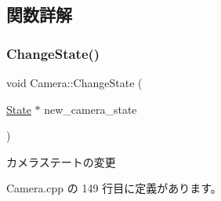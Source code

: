\subsection{関数詳解}
\mbox{\label{class_camera_abb88028a49a71e9a6774d58076816dbf}} 
\subsubsection{\texorpdfstring{Change\+State()}{ChangeState()}}
{\footnotesize\ttfamily void Camera\+::\+Change\+State (\begin{DoxyParamCaption}\item[{\mbox{\hyperlink{class_camera_1_1_state}{State}} $\ast$}]{new\+\_\+camera\+\_\+state }\end{DoxyParamCaption})}



カメラステートの変更 



 Camera.\+cpp の 149 行目に定義があります。

